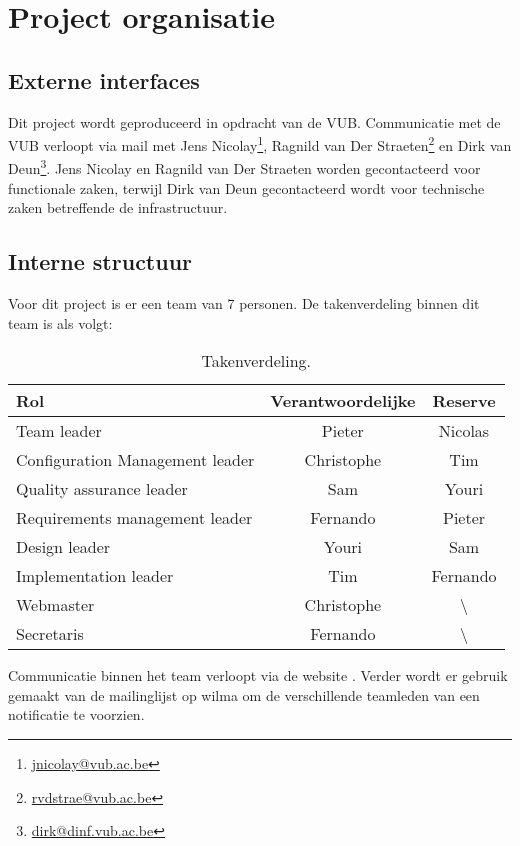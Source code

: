 \chapter{Project organisatie}
\section{Externe interfaces}
Dit project wordt geproduceerd in opdracht van de VUB. Communicatie met de VUB verloopt via mail met Jens Nicolay\footnote{\href{mailto:jnicolay@vub.ac.be}{jnicolay@vub.ac.be}}, Ragnild van Der Straeten\footnote{\href{mailto:rvdstrae@vub.ac.be}{rvdstrae@vub.ac.be}} en Dirk van Deun\footnote{\href{mailto:dirk@dinf.vub.ac.be}{dirk@dinf.vub.ac.be}}. Jens Nicolay en Ragnild van Der Straeten worden gecontacteerd voor functionale zaken, terwijl Dirk van Deun gecontacteerd wordt voor technische zaken betreffende de infrastructuur.

\section{Interne structuur}
Voor dit project is er een team van 7 personen. De takenverdeling binnen dit team is als volgt:
\begin{table} [H]
	\centering
	\caption{Takenverdeling.}
	\begin{tabular} {l|cc}
		Rol & Verantwoordelijke & Reserve \\
		\hline
		Team leader & Pieter & Nicolas \\
		Configuration Management leader & Christophe & Tim \\
		Quality assurance leader & Sam & Youri \\
		Requirements management leader & Fernando & Pieter \\
		Design leader & Youri & Sam \\
		Implementation leader & Tim & Fernando \\
		\hline
		Webmaster & Christophe & \textbackslash \\
		Secretaris & Fernando & \textbackslash 
	\end{tabular}
	\label{tab:takenverdeling}
\end{table}
Communicatie binnen het team verloopt via de website \cite{portalWebsite}. Verder wordt er gebruik gemaakt van de mailinglijst op wilma om de verschillende teamleden van een notificatie te voorzien.